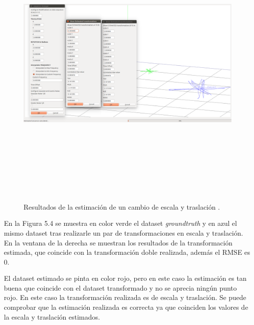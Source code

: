\begin{figure}[H]
\begin{center}
\label{fig:traslaEscalaTest}\includegraphics[height=14.0cm,width=18.0cm]{img/cap6/Escala_Traslacion_abba.png}
\hspace{0.5cm}

\end{center}

\caption{Resultados de la estimación de un cambio de escala y traslación .}
\end{figure}

En la Figura 5.4 se muestra en color verde el dataset \textit{groundtruth} y en azul el mismo dataset tras realizarle un par de transformaciones en escala y traslación.
En la ventana de la derecha se muestran los resultados de la transformación estimada, que coincide con la transformación doble realizada, además el RMSE es 0.

El dataset estimado se pinta en color rojo, pero en este caso la estimación es tan buena que coincide con el dataset transformado y no se aprecia ningún punto rojo.
En este caso la transformación realizada es de escala y traslación. Se puede comprobar que la estimación realizada es correcta ya que coinciden los valores de la escala y traslación estimados.

